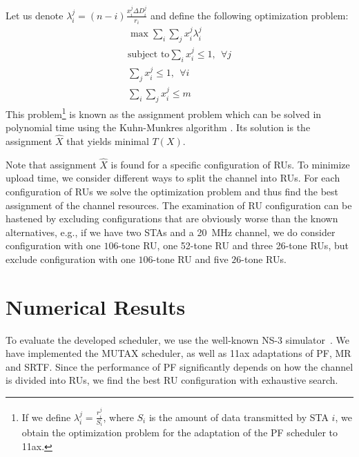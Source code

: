 Let us denote $\lambda_i^j = \left(n - i\right) \frac{x_i^j \Delta D_i^j}{r_{i}}$ and define the following optimization problem:
\begin{align*}
	\max \sum_{i} \sum_{j} x_i^j \lambda_i^j \\
	\text{subject to} \sum_{i} x_i^j \leq 1,\ \  \forall j \\
	\sum_{j} x_i^j \leq 1, \ \ \forall i \\
	\sum_{i} \sum_{j} x_i^j \leq m
\end{align*}
This problem\footnote{If we define $\lambda_i^j = \frac{r_i^j}{S_i}$, where $S_i$ is the amount of data transmitted by STA $i$, we obtain the optimization problem for the adaptation of the PF scheduler to 11ax.} is known as the assignment problem which can be solved in polynomial time using the Kuhn-Munkres algorithm \cite{bourgeois1971extension}.
Its solution is the assignment $\hat X$ that yields minimal $T(X)$.

Note that assignment $\hat X$ is found for a specific configuration of RUs.
To minimize upload time, we consider different ways to split the channel into RUs. For each configuration of RUs we solve the optimization problem and thus find the best assignment of the channel resources.
The examination of RU configuration can be hastened by excluding configurations that are obviously worse than the known alternatives, e.g., if we have two STAs and a \SI{20}{\MHz} channel, we do consider configuration with one $106$-tone RU, one 52-tone RU and three 26-tone RUs, but exclude configuration with one $106$-tone RU and five $26$-tone RUs.

\section{Numerical  Results}
\label{numerical}
To evaluate the developed scheduler, we use  the well-known NS-3 simulator~\cite{ns-3}.
We have implemented the MUTAX scheduler, as well as 11ax adaptations of PF, MR and SRTF.
Since the performance of PF significantly depends on how the channel is divided into RUs, we find the best RU configuration with exhaustive search.

